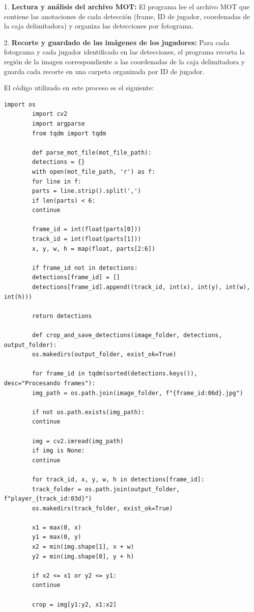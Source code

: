 \documentclass[12pt, a4paper, twoside]{article}
\begin{document}
	1. \textbf{Lectura y análisis del archivo MOT:} El programa lee el archivo MOT que contiene las anotaciones de cada detección (frame, ID de jugador, coordenadas de la caja delimitadora) y organiza las detecciones por fotograma.
	
	2. \textbf{Recorte y guardado de las imágenes de los jugadores:} Para cada fotograma y cada jugador identificado en las detecciones, el programa recorta la región de la imagen correspondiente a las coordenadas de la caja delimitadora y guarda cada recorte en una carpeta organizada por ID de jugador.
	
	El código utilizado en este proceso es el siguiente:
	\vspace{0.5cm}
	
	\begin{lstlisting}[style=pythonstyle]
		import os 
		import cv2
		import argparse
		from tqdm import tqdm
		
		def parse_mot_file(mot_file_path):
		detections = {}
		with open(mot_file_path, 'r') as f:
		for line in f:
		parts = line.strip().split(',')
		if len(parts) < 6:
		continue
		
		frame_id = int(float(parts[0]))
		track_id = int(float(parts[1]))
		x, y, w, h = map(float, parts[2:6])
		
		if frame_id not in detections:
		detections[frame_id] = []
		detections[frame_id].append((track_id, int(x), int(y), int(w), int(h)))
		
		return detections
		
		def crop_and_save_detections(image_folder, detections, output_folder):
		os.makedirs(output_folder, exist_ok=True)
		
		for frame_id in tqdm(sorted(detections.keys()), desc="Procesando frames"):
		img_path = os.path.join(image_folder, f"{frame_id:06d}.jpg")
		
		if not os.path.exists(img_path):
		continue
		
		img = cv2.imread(img_path)
		if img is None:
		continue
		
		for track_id, x, y, w, h in detections[frame_id]:
		track_folder = os.path.join(output_folder, f"player_{track_id:03d}")
		os.makedirs(track_folder, exist_ok=True)
		
		x1 = max(0, x)
		y1 = max(0, y)
		x2 = min(img.shape[1], x + w)
		y2 = min(img.shape[0], y + h)
		
		if x2 <= x1 or y2 <= y1:
		continue
		
		crop = img[y1:y2, x1:x2]
		

\end{lstlisting}
\end{document}
